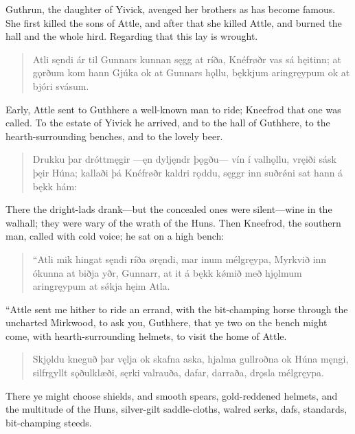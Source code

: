 \bookStart

Guthrun, the daughter of Yivick, avenged her brothers as has become famous. She first killed the sons of Attle, and after that she killed Attle, and burned the hall and the whole hird. Regarding that this lay is wrought.

\begin{verse}
\bva Atli sęndi \hld ár til Gunnars
kunnan sęgg at ríða, \hld Knéfrøðr vas sá hęitinn;
at gǫrðum kom hann Gjúka \hld ok at Gunnars hǫllu,
bękkjum aringręypum \hld ok at bjóri svásum. 
\end{verse}

\bvb Early, Attle sent to Guthhere a well-known man to ride; Kneefrod that one was called. To the estate of Yivick he arrived, and to the hall of Guthhere, to the hearth-surrounding benches, and to the lovely beer.

\begin{verse}
\bva Drukku þar dróttmęgir \hld —ęn dyljęndr þǫgðu—
vín í valhǫllu, \hld vręiði sásk þęir Húna;
kallaði þá Knéfrøðr \hld kaldri rǫddu,
sęggr inn suðrǿni \hld sat hann á bękk hám: 
\end{verse}

\bvb There the dright-lads drank—but the concealed ones were silent—wine in the walhall; they were wary of the wrath of the Huns. Then Kneefrod, the southern man, called with cold voice; he sat on a high bench:

\begin{verse}
\bva “Atli mik hingat sęndi \hld ríða øręndi,
mar inum mélgręypa, \hld Myrkvið inn ókunna
at biðja yðr, Gunnarr, \hld at it á bękk kǿmið
með hjǫlmum aringręypum \hld at sǿkja hęim Atla. 
\end{verse}

\bvb “Attle sent me hither to ride an errand, with the bit-champing horse through the uncharted Mirkwood, to ask you, Guthhere, that ye two on the bench might come, with hearth-surrounding helmets, to visit the home of Attle.

\begin{verse}
\bva Skjǫldu kneguð þar vęlja \hld ok skafna aska,
hjalma gullroðna \hld ok Húna męngi,
silfrgyllt sǫðulklæði, \hld sęrki valrauða,
dafar, darraða, \hld drǫsla mélgręypa. 
\end{verse}

\bvb There ye might choose shields, and smooth spears, gold-reddened helmets, and the multitude of the Huns, silver-gilt saddle-cloths, walred serks, dafs, standards, bit-champing steeds.

